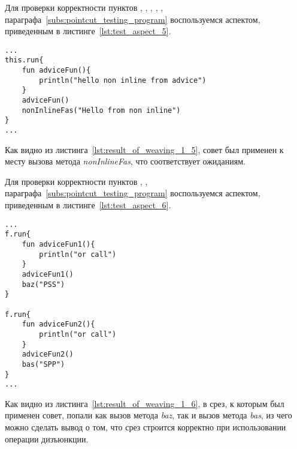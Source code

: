Для проверки корректности пунктов \quotes{\ref{list:method_name_check}},
\quotes{\ref{list:class_name_check}},
\quotes{\ref{list:method_params_check}},
\quotes{\ref{list:method_modifiers_check}},
\quotes{\ref{list:method_inline_check}},
\quotes{\ref{list:logic_operations_check}} параграфа~\ref{subs:pointcut_testing_program} воспользуемся аспектом, приведенным в листинге~\ref{lst:test_aspect_5}.
\begin{lstlisting}[style={java}, label={lst:result_of_weaving_1_5},
 caption={Результат применения аспекта, описанного в листинге~\ref{lst:test_aspect_5}, к тестовой программе}]
...
this.run{
	fun adviceFun(){
        println("hello non inline from advice")
    }
	adviceFun()
	nonInlineFas("Hello from non inline")
}
...
\end{lstlisting}
Как видно из листинга~\ref{lst:result_of_weaving_1_5}, совет был применен к месту вызова метода \textit{nonInlineFas}, что соответствует ожиданиям.

 Для проверки корректности пунктов
 \quotes{\ref{list:method_name_check}},
 \quotes{\ref{list:class_name_check}},
 \quotes{\ref{list:logic_operations_check}} параграфа~\ref{subs:pointcut_testing_program} воспользуемся аспектом, приведенным в листинге~\ref{lst:test_aspect_6}.
 \begin{lstlisting}[style={java}, label={lst:result_of_weaving_1_6},
 caption={Результат применения аспекта, описанного в листинге~\ref{lst:test_aspect_6}, к тестовой программе}]
...
f.run{
	fun adviceFun1(){
        println("or call")
    }
	adviceFun1()
	baz("PSS")
}

f.run{
	fun adviceFun2(){
        println("or call")
    }
	adviceFun2()
	bas("SPP")
}
...
\end{lstlisting}
Как видно из листинга~\ref{lst:result_of_weaving_1_6}, в срез, к которым был применен совет, попали как вызов метода \textit{baz}, так и вызов метода \textit{bas}, из чего можно сделать вывод о том, что срез строится корректно при использовании операции дизъюнкции.
